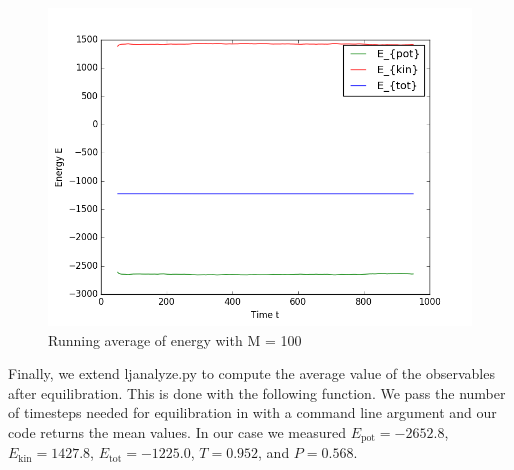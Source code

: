 \begin{figure}[h]
  \includegraphics[width=\linewidth]{fig/avEnergies_M100.png}
  \caption{Running average of energy with M = 100}\label{fig:energy2}
\endminipage
\end{figure}
Finally, we extend ljanalyze.py to compute the average value of the observables after equilibration. This is done with the following function.
We pass the number of timesteps needed for equilibration in with a command line argument and our code returns the mean values.
In our case we measured $E_\mathrm{pot} = -2652.8$, $E_\mathrm{kin} = 1427.8$, $E_\mathrm{tot} = -1225.0$, $T = 0.952$, and $P = 0.568$.


